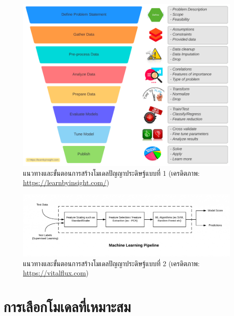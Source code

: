 \begin{figure}[H]
    \centering
    \includegraphics[width=\linewidth]{fig/ml_workflow.png}
    \caption{แนวทางและขั้นตอนการสร้างโมเดลปัญญาประดิษฐ์แบบที่ 1 (เครดิตภาพ: \url{https://learnbyinsight.com/})}
    \label{fig:ml_workflow}
\end{figure}

\begin{figure}[H]
    \centering
    \includegraphics[width=\linewidth]{fig/ml_pipeline.png}
    \caption{แนวทางและขั้นตอนการสร้างโมเดลปัญญาประดิษฐ์แบบที่ 2 (เครดิตภาพ: \url{https://vitalflux.com})}
    \label{fig:ml_pipeline}
\end{figure}

\section{การเลือกโมเดลที่เหมาะสม}
\label{sec:choose_ml_model}

